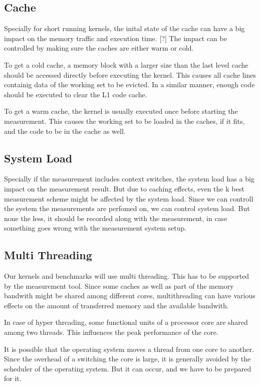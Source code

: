 \documentclass[12pt]{article}
\begin{document}
\subsection{Cache}
Specially for short running kernels, the inital state of the cache can have a big impact on the memory traffic and execution time. [?] The impact can be controlled by making sure the caches are either warm or cold.

To get a cold cache, a memory block with a larger size than the last level cache should be accessed directly before executing the kernel. This causes all cache lines containig data of the working set to be evicted. In a similar manner, enough code should be executed to clear the L1 code cache.

To get a warm cache, the kernel is usually executed once before starting the measurement. This causes the working set to be loaded in the caches, if it fits, and the code to be in the cache as well.

\subsection{System Load}
Specially if the measurement includes context switches, the system load has a big impact on the measurement result. But due to caching effects, even the k best measurement scheme might be affected by the system load. Since we can controll the system the measurements are perfomed on, we can control system load. But none the less, it should be recorded along with the measurement, in case something goes wrong with the measurement system setup.

\subsection{Multi Threading}
Our kernels and benchmarks will use multi threading. This has to be supported by the measurement tool. Since some caches as well as part of the memory bandwith might be shared among different cores, multithreading can have various effects on the amount of transferred memory and the available bandwith.

In case of hyper threading, some functional units of a processor core are shared among two threads. This influences the peak performance of the core.

It is possible that the operating system moves a thread from one core to another. Since the overhead of a switching the core is large, it is generally avoided by the scheduler of the operating system. But it can occur, and we have to be prepared for it. 
\end{document}
